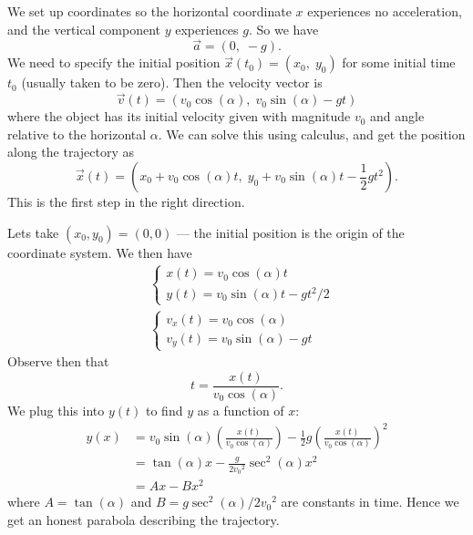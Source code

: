 \M We set up coordinates so the horizontal coordinate $x$ experiences no
acceleration, and the vertical component $y$ experiences $g$. So we have
\begin{equation}
\vec{a} = (0,\; -g).
\end{equation}
We need to specify the initial position $\vec{x}(t_{0})=(x_{0},\; y_{0})$
for some initial time $t_{0}$ (usually taken to be zero). Then the
velocity vector is
\begin{equation}
\vec{v}(t) = (v_{0}\cos(\alpha),\; v_{0}\sin(\alpha) - gt)
\end{equation}
where the object has its initial velocity given with magnitude $v_{0}$
and angle relative to the horizontal $\alpha$. We can solve this using
calculus, and get the position along the trajectory as
\begin{equation}
\vec{x}(t) = \left(x_{0} + v_{0}\cos(\alpha)t,\; y_{0} + v_{0}\sin(\alpha)t-\frac{1}{2}gt^{2}\right).
\end{equation}
This is the first step in the right direction.

Lets take $(x_{0}, y_{0})=(0,0)$ --- the initial position is the origin
of the coordinate system. We then have
\begin{subequations}
\begin{align}
&\left\{
\begin{array}{l}
x(t) = v_{0}\cos(\alpha)t\\
y(t) = v_{0}\sin(\alpha)t - gt^{2}/2
\end{array}\right.\\
&\left\{
\begin{array}{l}
v_{x}(t) = v_{0}\cos(\alpha)\\
v_{y}(t) = v_{0}\sin(\alpha) - gt
\end{array}\right.
\end{align}
\end{subequations}
Observe then that
\begin{equation}
t = \frac{x(t)}{v_{0}\cos(\alpha)}.
\end{equation}
We plug this into $y(t)$ to find $y$ as a function of $x$:
\begin{equation}
\begin{split}
y(x)
&=v_{0}\sin(\alpha)\left(\frac{x(t)}{v_{0}\cos(\alpha)}\right)
   - \frac{1}{2}g\left(\frac{x(t)}{v_{0}\cos(\alpha)}\right)^{2}\\
&=\tan(\alpha)x - \frac{g}{2{v_{0}}^{2}}\sec^{2}(\alpha)x^{2}\\
&=Ax-Bx^{2}
\end{split}
\end{equation}
where $A=\tan(\alpha)$ and $B=g\sec^{2}(\alpha)/2{v_{0}}^{2}$ are
constants in time. Hence we get an honest parabola describing the
trajectory.


